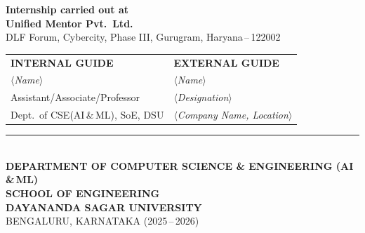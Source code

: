 \documentclass[12pt, a4paper]{report}
\begin{document}
\begin{center}
  \vspace{0.35cm}
  {\normalsize\bfseries Internship carried out at}\\[4pt]
  {\large\bfseries\color{dsublue} Unified Mentor Pvt.\ Ltd.}\\[2pt]
  {\normalsize DLF Forum, Cybercity, Phase III, Gurugram, Haryana\,--\,122002}

  \vspace{0.4cm}
  \begin{tabular}{C{0.45\textwidth}C{0.45\textwidth}}
    \textbf{INTERNAL GUIDE} & \textbf{EXTERNAL GUIDE} \\[6pt]
    $\langle$\textit{Name}$\rangle$ & $\langle$\textit{Name}$\rangle$ \\[4pt]
    Assistant/Associate/Professor & $\langle$\textit{Designation}$\rangle$ \\[4pt]
    Dept.\ of CSE(AI\,\&\,ML), SoE, DSU &
      $\langle$\textit{Company Name, Location}$\rangle$ \\
  \end{tabular}

  \vfill

  {\rule{\textwidth}{1.5pt}}\\[6pt]
  {\normalsize\bfseries DEPARTMENT OF COMPUTER SCIENCE \& ENGINEERING (AI\,\&\,ML)}\\[2pt]
  {\normalsize\bfseries SCHOOL OF ENGINEERING}\\[2pt]
  {\large\bfseries DAYANANDA SAGAR UNIVERSITY}\\[2pt]
  {\normalsize BENGALURU, KARNATAKA \quad (2025\,--\,2026)}

\end{center}
\restoregeometry
\clearpage
\end{document}
